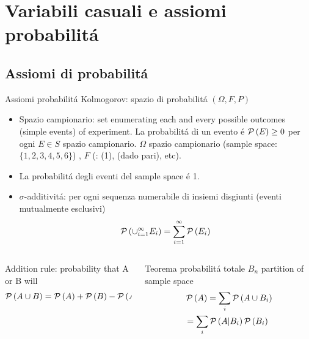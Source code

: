 \documentclass[asd-beamer.tex]{subfiles}
\begin{document}
\section{Variabili casuali e assiomi probabilit\'a}

\subsection{Assiomi di probabilit\'a}

\begin{frame}{Assiomi probabilit\'a Kolmogorov: spazio di probabilit\'a $(\Omega,F,P)$}
\begin{itemize}
\item Spazio campionario: set enumerating each and every possible outcomes (simple events) of experiment. La probabilit\'a di un evento \'e $\operatorname{\mathcal{P}}{(E)}\geq0$ per ogni $E\in S$ spazio campionario. $\Omega$ spazio campionario (sample space: $\{1,2,3,4,5,6\}$) , $F$ (: (1), (dado pari), etc).
\item La probabilit\'a degli eventi del sample space \'e 1.
\item $\sigma$-additivit\'a: per ogni sequenza numerabile di insiemi disgiunti (eventi mutualmente esclusivi)
\begin{equation*}
\operatorname{\mathcal{P}}{(\cup_{i=1}^{\infty}E_i)}=\sum_{i=1}^{\infty}\operatorname{\mathcal{P}}{(E_i)}
\end{equation*}
\end{itemize}
\begin{columns}[T]
	\begin{column}{0.5\textwidth}
\begin{block}{Addition rule: probability that A or B will}
\begin{equation*}
\operatorname{\mathcal{P}}{(A\cup B)}=\operatorname{\mathcal{P}}{(A)}+\operatorname{\mathcal{P}}{(B)}-\operatorname{\mathcal{P}}{(A\cap B)}
\end{equation*}
\end{block}
\end{column}
\begin{column}{0.5\textwidth}
\begin{block}{Teorema probabilit\'a totale}
$B_n$ partition of sample space
\begin{align*}
&\operatorname{\mathcal{P}}{(A)}=\sum_i\operatorname{\mathcal{P}}{(A\cup B_i)}\\
&=\sum_i\operatorname{\mathcal{P}}{(A|B_i)}\operatorname{\mathcal{P}}{(B_i)}
\end{align*}
\end{block}
\end{column}
\end{columns}
\end{frame}
\end{document}
